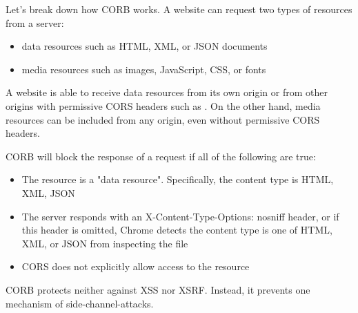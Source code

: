 Let’s break down how CORB works. A website can request two types of resources from a server:
\begin{itemize}
	\item data resources such as HTML, XML, or JSON documents
	\item media resources such as images, JavaScript, CSS, or fonts
\end{itemize}
A website is able to receive data resources from its own origin or from other origins with permissive CORS headers such as . On the other hand, media resources can be included from any origin, even without permissive CORS headers.

CORB will block the response of a request if all of the following are true:
\begin{itemize}
	\item The resource is a "data resource". Specifically, the content type is HTML, XML, JSON
	\item The server responds with an X-Content-Type-Options: nosniff header, or if this header is omitted, Chrome detects the content type is one of HTML, XML, or JSON from inspecting the file
	\item CORS does not explicitly allow access to the resource
\end{itemize}

CORB protects neither against XSS nor XSRF. Instead, it prevents one mechanism of side-channel-attacks.

